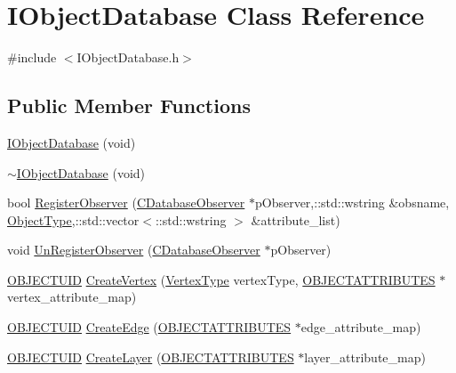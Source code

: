 \hypertarget{class_i_object_database}{}\section{I\+Object\+Database Class Reference}
\label{class_i_object_database}


{\ttfamily \#include $<$I\+Object\+Database.\+h$>$}

\subsection*{Public Member Functions}
\begin{DoxyCompactItemize}
\item 
\hyperlink{class_i_object_database_ac5eae8e98e5d6b5ed2b4b20fee540497}{I\+Object\+Database} (void)
\item 
\hyperlink{class_i_object_database_a159bfa1bf20928f7811af36b1915559c}{$\sim$\+I\+Object\+Database} (void)
\item 
bool \hyperlink{class_i_object_database_a40b92b9c19dbc9a4a6f491ac929a2e54}{Register\+Observer} (\hyperlink{class_c_database_observer}{C\+Database\+Observer} $\ast$p\+Observer,\+::std\+::wstring \&obsname, \hyperlink{_object_database_defines_8h_a842c5e2e69277690b064bf363c017980}{Object\+Type},\+::std\+::vector$<$\+::std\+::wstring $>$ \&attribute\+\_\+list)
\item 
void \hyperlink{class_i_object_database_a35843fc30d48520313c15d615afff875}{Un\+Register\+Observer} (\hyperlink{class_c_database_observer}{C\+Database\+Observer} $\ast$p\+Observer)
\item 
\hyperlink{_object_database_defines_8h_a164ec120b01429b93c9cd0bef2a67e64}{O\+B\+J\+E\+C\+T\+U\+I\+D} \hyperlink{class_i_object_database_ad533354bd582da308d64ef55e66fb4e1}{Create\+Vertex} (\hyperlink{_object_database_defines_8h_afa099a55c5746eff5a0e1ffc04f53cc0}{Vertex\+Type} vertex\+Type, \hyperlink{_object_database_defines_8h_a52d1b76b66b20eeaf0c5dc8127da21d7}{O\+B\+J\+E\+C\+T\+A\+T\+T\+R\+I\+B\+U\+T\+E\+S} $\ast$vertex\+\_\+attribute\+\_\+map)
\item 
\hyperlink{_object_database_defines_8h_a164ec120b01429b93c9cd0bef2a67e64}{O\+B\+J\+E\+C\+T\+U\+I\+D} \hyperlink{class_i_object_database_a895d55994bece2fa4c7eefb7252df7ae}{Create\+Edge} (\hyperlink{_object_database_defines_8h_a52d1b76b66b20eeaf0c5dc8127da21d7}{O\+B\+J\+E\+C\+T\+A\+T\+T\+R\+I\+B\+U\+T\+E\+S} $\ast$edge\+\_\+attribute\+\_\+map)
\item 
\hyperlink{_object_database_defines_8h_a164ec120b01429b93c9cd0bef2a67e64}{O\+B\+J\+E\+C\+T\+U\+I\+D} \hyperlink{class_i_object_database_add516d13e2f3e75ebb8f34094e726a01}{Create\+Layer} (\hyperlink{_object_database_defines_8h_a52d1b76b66b20eeaf0c5dc8127da21d7}{O\+B\+J\+E\+C\+T\+A\+T\+T\+R\+I\+B\+U\+T\+E\+S} $\ast$layer\+\_\+attribute\+\_\+map)

\end{DoxyCompactItemize}
